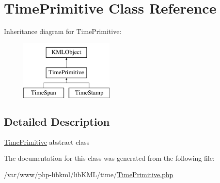 \hypertarget{classTimePrimitive}{
\section{TimePrimitive Class Reference}
\label{d0/d5e/classTimePrimitive}
}
Inheritance diagram for TimePrimitive:\begin{figure}[H]
\begin{center}
\leavevmode
\includegraphics[height=3.000000cm]{d0/d5e/classTimePrimitive}
\end{center}
\end{figure}


\subsection{Detailed Description}
\hyperlink{classTimePrimitive}{TimePrimitive} abstract class 

The documentation for this class was generated from the following file:\begin{DoxyCompactItemize}
\item 
/var/www/php-\/libkml/libKML/time/\hyperlink{TimePrimitive_8php}{TimePrimitive.php}\end{DoxyCompactItemize}
